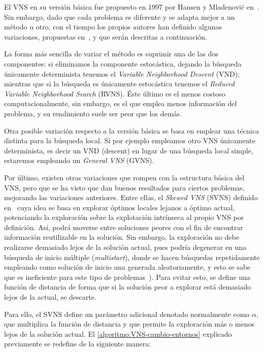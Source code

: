 El VNS en su versión básica fue propuesto en 1997 por Hansen y Mladenovi\'{c} en~\cite{vns1997}. Sin embargo, dado que cada problema es diferente y se adapta mejor a un método u otro, con el tiempo los propios autores han definido algunas variaciones, propuestas en~\cite{vns1999, vns2003}, y que serán descritas a continuación.

La forma más sencilla de variar el método es suprimir una de las dos componentes: si eliminamos la componente estocástica, dejando la búsqueda únicamente determinista tenemos el \textit{Variable Neighborhood Descent} (VND); mientras que si la búsqueda es únicamente estocástica tenemos el \textit{Reduced Variable Neighborhood Search} (RVNS). Éste último es el menos costoso computacionalmente, sin embargo, es el que emplea menos información del problema, y su rendimiento suele ser peor que los demás.

Otra posible variación respecto a la versión básica se basa en emplear una técnica distinta para la búsqueda local. Si por ejemplo empleamos otro VNS únicamente determinista, es decir un VND (descent) en lugar de una búsqueda local simple, estaremos empleando un \textit{General VNS} (GVNS).



Por último, existen otras variaciones que rompen con la estructura básica del VNS, pero que se ha visto que dan buenos resultados para ciertos problemas, mejorando las variaciones anteriores. Entre ellas, el \textit{Skewed VNS} (SVNS) definido en~\cite{svns-def} cuya idea se basa en explorar óptimos locales lejanos a óptimo actual, potenciando la exploración sobre la explotación intrínseca al propio VNS por definición. Así, podrá moverse entre soluciones peores con el fin de encontrar información reutilizable en la solución. Sin embargo, la exploración no debe realizarse demasiado lejos de la solución actual, pues podría degenerar en una búsqueda de inicio múltiple (\textit{multistart}), donde se hacen búsquedas repetidamente empleando como solución de inicio una generada aleatoriamente, y esto se sabe que es ineficiente para este tipo de problemas~\cite{vns}). Para evitar esto, se define una función de distancia de forma que si la solución peor a explorar está demasiado lejos de la actual, se descarte.

Para ello, el SVNS define un parámetro adicional denotado normalmente como $\alpha$, que multiplica la función de distancia y que permite la exploración más o menos lejos de la solución actual. El \autoref{algoritmo:VNS-cambio-entornos} explicado previamente se redefine de la siguiente manera:

